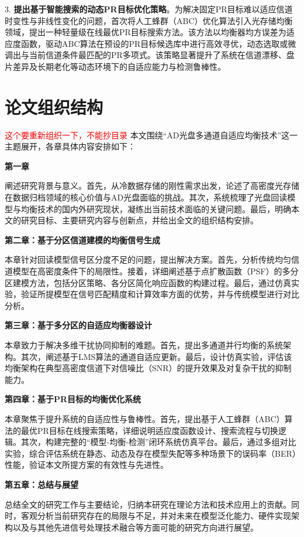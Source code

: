 3. \textbf{提出基于智能搜索的动态PR目标优化策略}。为解决固定PR目标难以适应信道时变性与非线性变化的问题，首次将人工蜂群（ABC）优化算法引入光存储均衡领域，提出一种轻量级在线最优PR目标搜索方法。该方法以均衡器均方误差为适应度函数，驱动ABC算法在预设的PR目标候选库中进行高效寻优，动态选取或微调出与当前信道条件最匹配的PR多项式。该策略显著提升了系统在信道漂移、盘片差异及长期老化等动态环境下的自适应能力与检测鲁棒性。

\section{论文组织结构}

\textcolor{red}{这个要重新组织一下，不能抄目录}
本文围绕“AD光盘多通道自适应均衡技术”这一主题展开，各章具体内容安排如下：

\textbf{第一章}

阐述研究背景与意义。首先，从冷数据存储的刚性需求出发，论述了高密度光存储在数据归档领域的核心价值与AD光盘面临的挑战。其次，系统梳理了光盘回读模型与均衡技术的国内外研究现状，凝练出当前技术面临的关键问题。最后，明确本文的研究目标、主要研究内容与创新点，并给出全文的组织结构安排。

\textbf{第二章：基于分区信道建模的均衡信号生成}

本章针对回读模型信号区分度不足的问题，提出解决方案。首先，分析传统均匀信道模型在高密度条件下的局限性。接着，详细阐述基于点扩散函数（PSF）的多分区建模方法，包括分区策略、各分区简化响应函数的构建过程。最后，通过仿真实验，验证所提模型在信号匹配精度和计算效率方面的优势，并与传统模型进行对比分析。

\textbf{第三章：基于多分区的自适应均衡器设计}

本章致力于解决多维干扰协同抑制的难题。首先，提出多通道并行均衡的系统架构。其次，阐述基于LMS算法的通道自适应更新。最后，设计仿真实验，评估该均衡架构在典型高密度信道下对信噪比（SNR）的提升效果及对复杂干扰的抑制能力。


\textbf{第四章：基于PR目标的均衡优化系统}

本章聚焦于提升系统的自适应性与鲁棒性。首先，提出基于人工蜂群（ABC）算法的最优PR目标在线搜索策略，详细说明适应度函数设计、搜索流程与切换逻辑。其次，构建完整的“模型-均衡-检测”闭环系统仿真平台。最后，通过多组对比实验，综合评估系统在静态、动态及存在模型失配等多种场景下的误码率（BER）性能，验证本文所提方案的有效性与先进性。

\textbf{第五章：总结与展望}

总结全文的研究工作与主要结论，归纳本研究在理论方法和技术应用上的贡献。同时，客观分析当前研究存在的局限与不足，并对未来在模型泛化能力、硬件实现架构以及与其他先进信号处理技术融合等方面可能的研究方向进行展望。
